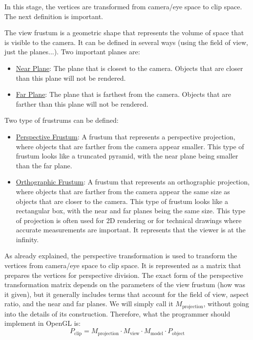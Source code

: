 In this stage, the vertices are transformed from camera/eye space to clip space. The next definition is important.
\begin{definicion}[Frustrum]
The view frustum is a geometric shape that represents the volume of space that is visible to the camera. It can be defined in several ways (using the field of view, just the planes...). Two important planes are:
\begin{itemize}
    \item \ul{Near Plane}: The plane that is closest to the camera. Objects that are closer than this plane will not be rendered.
    \item \ul{Far Plane}: The plane that is farthest from the camera. Objects that are farther than this plane will not be rendered.
\end{itemize}
\end{definicion}

Two type of frustrums can be defined:
\begin{itemize}
    \item \ul{Perspective Frustum}: A frustum that represents a perspective projection, where objects that are farther from the camera appear smaller. This type of frustum looks like a truncated pyramid, with the near plane being smaller than the far plane.
    \item \ul{Orthographic Frustum}: A frustum that represents an orthographic projection, where objects that are farther from the camera appear the same size as objects that are closer to the camera.
    This type of frustum looks like a rectangular box, with the near and far planes being the same size. This type of projection is often used for 2D rendering or for technical drawings where accurate measurements are important. It represents that the viewer is at the infinity.
\end{itemize}

As already explained, the perspective transformation is used to transform the vertices from camera/eye space to clip space. It is represented as a matrix that prepares the vertices for perspective division. The exact form of the perspective transformation matrix depends on the parameters of the view frustum (how was it given), but it generally includes terms that account for the field of view, aspect ratio, and the near and far planes. We will simply call it $M_{\text{projection}}$, without going into the details of its construction. Therefore, what the programmer should implement in OpenGL is:
\begin{equation*}
    P_{\text{clip}} = M_{\text{projection}}\cdot M_{\text{view}} \cdot M_{\text{model}} \cdot P_{\text{object}}
\end{equation*}

